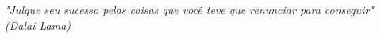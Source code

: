 \begin{epigrafe} %
    \vspace*{\fill}
	\begin{flushright}
		\textit{"Julgue seu sucesso pelas coisas que você teve que renunciar para conseguir"\\
		(Dalai Lama)}
	\end{flushright}
\end{epigrafe}



\setlength{\absparsep}{18pt} %
